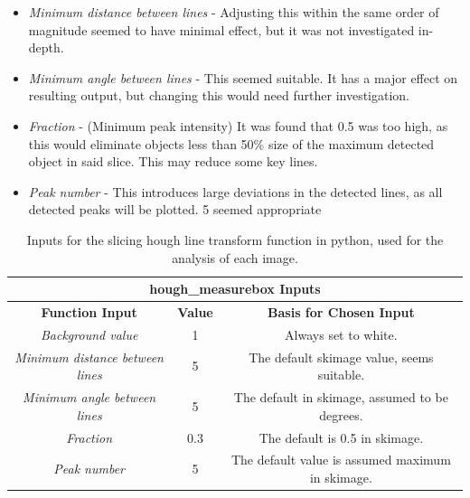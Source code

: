 \documentclass{article}
\begin{document}
\begin{itemize}
    \item \textit{Minimum distance between lines} - Adjusting this within the same order of magnitude seemed to have minimal effect, but it was not investigated in-depth.

    \item \textit{Minimum angle between lines} - This seemed suitable. It has a major effect on resulting output, but changing this would need further investigation.

    \item \textit{Fraction} - (Minimum peak intensity) It was found that 0.5 was too high, as this would eliminate objects less than 50\% size of the maximum detected object in said slice. This may reduce some key lines.

    \item \textit{Peak number} - This introduces large deviations in the detected lines, as all detected peaks will be plotted. 5 seemed appropriate
\end{itemize}

\begin{table}[h]
	\begin{center}
	\begin{tabular}{ |c|c|c| } 
		\hline
		\multicolumn{3}{|c|}{\textbf{hough\_measurebox Inputs}} \\
		\hline
		\textbf{Function Input} & \textbf{Value} & \textbf{Basis for Chosen Input} \\
		\hline
		\textit{Background value} & 1 & Always set to white. \\
		\hline
		\textit{Minimum distance between lines} & 5 & The default skimage value, seems suitable. \\ 
		\hline
		\textit{Minimum angle between lines} & 5 & The default in skimage, assumed to be degrees. \\
		\hline
		\textit{Fraction} & 0.3 & The default is 0.5 in skimage. \\ 
		\hline
		\textit{Peak number} & 5 & The default value is assumed maximum in skimage. \\ 
		\hline
	\end{tabular}
	\caption{Inputs for the slicing hough line transform function in python, used for the analysis of each image.}
	\label{HoughmeasureboxInputs}
	\end{center}
\end{table}
\end{document}
